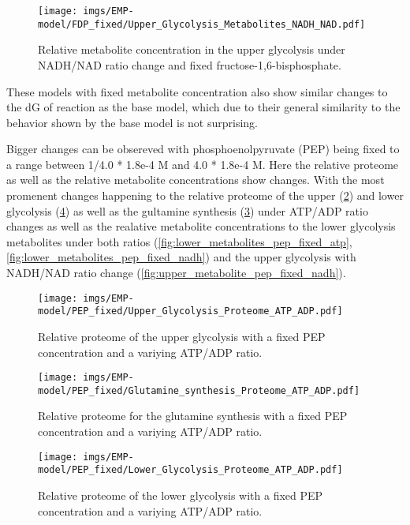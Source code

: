 \begin{figure}[H]
    \centering
    \texttt{[image: imgs/EMP-model/FDP\_fixed/Upper\_Glycolysis\_Metabolites\_NADH\_NAD.pdf]}
    \caption{Relative metabolite concentration in the upper glycolysis under NADH/NAD ratio change and fixed fructose-1,6-bisphosphate.}
    \label{fig:upper_metabolites_fdp_fixed_nadh}
\end{figure}

These models with fixed metabolite concentration also show similar changes to the dG of reaction as the base model, which due to their general similarity to the behavior shown by the base model is not surprising.

Bigger changes can be obsereved with phosphoenolpyruvate (PEP) being fixed to a range between 1/4.0 * 1.8e-4 M and 4.0 * 1.8e-4 M. Here the relative proteome as well as the relative metabolite concentrations show changes. With the most promenent changes happening to the relative proteome of the upper (\ref{fig:upper_proteome_pep_fixed_atp}) and lower glycolysis (\ref{fig:lower_proteome_pep_fixed_atp}) as well as the gultamine synthesis (\ref{fig:glutamine_proteome_pep_fixed_atp}) under ATP/ADP ratio changes as well as the realative metabolite concentrations to the lower glycolysis metabolites under both ratios (\ref{fig:lower_metabolites_pep_fixed_atp}, \ref{fig:lower_metabolites_pep_fixed_nadh}) and the upper glycolysis with NADH/NAD ratio change (\ref{fig:upper_metabolite_pep_fixed_nadh}). 
\begin{figure}[H]
    \centering
    \texttt{[image: imgs/EMP-model/PEP\_fixed/Upper\_Glycolysis\_Proteome\_ATP\_ADP.pdf]}
    \caption{Relative proteome of the upper glycolysis with a fixed PEP concentration and a variying ATP/ADP ratio.}
    \label{fig:upper_proteome_pep_fixed_atp}
\end{figure}

\begin{figure}[H]
    \centering
    \texttt{[image: imgs/EMP-model/PEP\_fixed/Glutamine\_synthesis\_Proteome\_ATP\_ADP.pdf]}
    \caption{Relative proteome for the glutamine synthesis with a fixed PEP concentration and a variying ATP/ADP ratio.}
    \label{fig:glutamine_proteome_pep_fixed_atp}
\end{figure}

\begin{figure}[H]
    \centering
    \texttt{[image: imgs/EMP-model/PEP\_fixed/Lower\_Glycolysis\_Proteome\_ATP\_ADP.pdf]}
    \caption{Relative proteome of the lower glycolysis with a fixed PEP concentration and a variying ATP/ADP ratio.}
    \label{fig:lower_proteome_pep_fixed_atp}
\end{figure}

